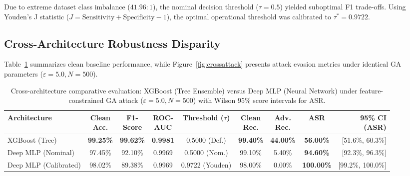 \documentclass[iicol,pdflatex,sn-mathphys-num]{sn-jnl}
\begin{document}
Due to extreme dataset class imbalance ($41.96:1$), the nominal decision threshold ($\tau = 0.5$) yielded suboptimal F1 trade-offs. Using Youden's J statistic ($J = \text{Sensitivity} + \text{Specificity} - 1$), the optimal operational threshold was calibrated to $\tau^* = 0.9722$.

\subsection{Cross-Architecture Robustness Disparity}
Table~\ref{tab:crossarch} summarizes clean baseline performance, while Figure~\ref{fig:crossattack} presents attack evasion metrics under identical GA parameters ($\varepsilon = 5.0, N=500$).

\begin{table}[htbp]
\centering
\scriptsize
\setlength{\tabcolsep}{1.5pt}
\caption{Cross-architecture comparative evaluation: XGBoost (Tree Ensemble) versus Deep MLP (Neural Network) under feature-constrained GA attack ($\varepsilon = 5.0, N=500$) with Wilson 95\% score intervals for ASR.}
\label{tab:crossarch}
\begin{tabular*}{\textwidth}{@{\extracolsep{\fill}}lcccccccr}
\toprule
\textbf{Architecture} & \makecell{\textbf{Clean}\\\textbf{Acc.}} & \makecell{\textbf{F1-}\\\textbf{Score}} & \makecell{\textbf{ROC-}\\\textbf{AUC}} & \makecell{\textbf{Threshold}\\\textbf{($\tau$)}} & \makecell{\textbf{Clean}\\\textbf{Rec.}} & \makecell{\textbf{Adv.}\\\textbf{Rec.}} & \textbf{ASR} & \makecell{\textbf{95\% CI}\\\textbf{(ASR)}} \\
\midrule
XGBoost (Tree) & \textbf{99.25\%} & \textbf{99.62\%} & \textbf{0.9981} & 0.5000 (Def.) & \textbf{99.40\%} & \textbf{44.00\%} & \textbf{56.00\%} & [51.6\%, 60.3\%] \\
Deep MLP (Nominal) & 97.45\% & 92.10\% & 0.9969 & 0.5000 (Nom.) & 99.10\% & 5.40\%  & \textbf{94.60\%} & [92.3\%, 96.3\%] \\
Deep MLP (Calibrated) & 98.02\% & 89.38\% & 0.9969 & 0.9722 (Youden)  & 98.00\% & 0.00\%  & \textbf{100.00\%} & [99.2\%, 100.0\%] \\
\bottomrule
\end{tabular*}
\end{table}
\end{document}
